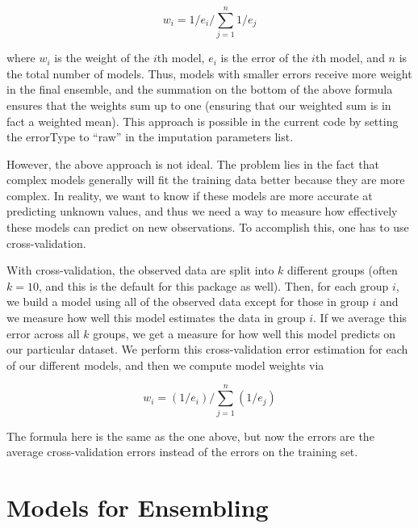 \documentclass[nojss]{jss}
\begin{document}
$$w_i = 1/e_i / \sum_{j = 1}^n 1/e_j$$

where $w_i$ is the weight of the $i$th model, $e_i$ is the error of the $i$th model, and $n$ is the total number of models.   Thus, models with smaller errors receive more weight in the final ensemble, and the summation on the bottom of the above formula ensures that the weights sum up to one (ensuring that our weighted sum is in fact a weighted mean).  This approach is possible in the current code by setting the errorType to ``raw'' in the imputation parameters list.

However, the above approach is not ideal.  The problem lies in the fact that complex models generally will fit the training data better because they are more complex.  In reality, we want to know if these models are more accurate at predicting unknown values, and thus we need a way to measure how effectively these models can predict on new observations.  
To accomplish this, one has to use cross-validation.

With cross-validation, the observed data are split into $k$ different groups (often $k=10$, and this is the default for this package as well).  Then, for each group $i$, we build a model using all of the observed data except for those in group $i$ and we measure how well this model estimates the data in group $i$.  If we average this error across all $k$ groups, we get a measure for how well this model predicts on our particular dataset.  We perform this cross-validation error estimation for each of our different models, and then we compute model weights via

$$w_i = \left(1/e_i\right) / \sum_{j = 1}^n \left(1/e_j\right)$$

The formula here is the same as the one above, but now the errors are the average cross-validation errors instead of the errors on the training set.

%
%
%


\section{Models for Ensembling}
\end{document}
